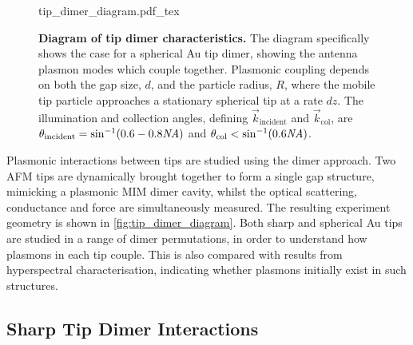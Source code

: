 \documentclass[a4paper]{article}
\begin{document}
\begin{figure}[h]
\centering
\def\svgwidth{0.5\textwidth}
{tip_dimer_diagram.pdf_tex}
\caption[Diagram of tip dimer characteristics]{\textbf{Diagram of tip dimer characteristics.} The diagram specifically shows the case for a spherical Au tip dimer, showing the antenna plasmon modes which couple together. Plasmonic coupling depends on both the gap size, $d$, and the particle radius, $R$, where the mobile tip particle approaches a stationary spherical tip at a rate $dz$. The illumination and collection angles, defining $\vec{k}_{\mathrm{incident}}$ and $\vec{k}_{\mathrm{col}}$, are $\theta_{\mathrm{incident}} = \sin^{-1}(0.6-0.8\mathit{NA})$ and $\theta_{\mathrm{col}} < \sin^{-1}(0.6\mathit{NA})$.}
\label{fig:tip_dimer_diagram}
\end{figure}

Plasmonic interactions between tips are studied using the dimer approach. Two AFM tips are dynamically brought together to form a single gap structure, mimicking a plasmonic MIM dimer cavity, whilst the optical scattering, conductance and force are simultaneously measured. The resulting experiment geometry is shown in \autoref{fig:tip_dimer_diagram}. Both sharp and spherical Au tips are studied in a range of dimer permutations, in order to understand how plasmons in each tip couple. This is also compared with results from hyperspectral characterisation, indicating whether plasmons initially exist in such structures.

\subsection{Sharp Tip Dimer Interactions}
\end{document}
